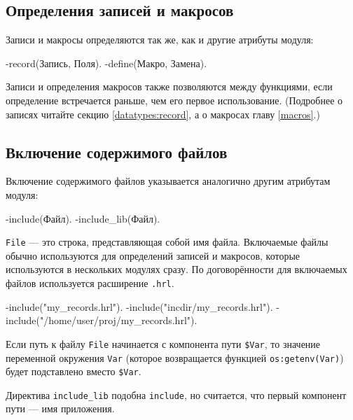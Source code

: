 \subsection{Определения записей и макросов}

Записи и макросы определяются так же, как и другие атрибуты модуля:

\begin{erlangru}
-record(Запись, Поля).
-define(Макро, Замена).
\end{erlangru}

Записи и определения макросов также позволяются между функциями, если 
определение встречается раньше, чем его первое использование. (Подробнее о
записях читайте секцию \ref{datatypes:record}, а о макросах главу \ref{macros}.)



\subsection{Включение содержимого файлов}

Включение содержимого файлов указывается аналогично другим атрибутам модуля:

\begin{erlangru}
-include(Файл).
-include_lib(Файл).
\end{erlangru}

\texttt{File} --- это строка, представляющая собой имя файла. Включаемые файлы 
обычно используются для определений записей и макросов, которые используются
в нескольких модулях сразу. По договорённости для включаемых файлов используется
расширение \texttt{.hrl}.

\begin{erlang}
-include("my_records.hrl").
-include("incdir/my_records.hrl").
-include("/home/user/proj/my_records.hrl").
\end{erlang}

Если путь к файлу \texttt{File} начинается с компонента пути \texttt{\$Var}, то
значение переменной окружения \texttt{Var} (которое возвращается функцией
\texttt{os:getenv(Var)}) будет подставлено вместо \texttt{\$Var}.


Директива \texttt{include\_lib} подобна \texttt{include}, но считается, что 
первый компонент пути --- имя приложения.


